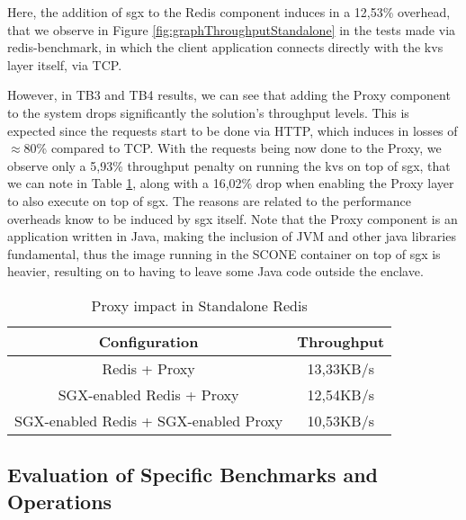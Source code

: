 Here, the addition of \gls{sgx} to the Redis component induces in a 12,53\% overhead, that we observe in Figure \ref{fig:graphThroughputStandalone} in the tests made via redis-benchmark, in which the client application connects directly with the \gls{kvs} layer itself, via TCP. 

However, in TB3 and TB4 results, we can see that adding the Proxy component to the system drops significantly the solution's throughput levels. This is expected since the requests start to be done via HTTP, which induces in losses of $\approx$80\% compared to TCP. With the requests being now done to the Proxy, we observe only a 5,93\% throughput penalty on running the \gls{kvs} on top of \gls{sgx}, that we can note in Table \ref{table:throughputSingleRedis}, along with a 16,02\% drop when enabling the Proxy layer to also execute on top of \gls{sgx}. The reasons are related to the performance overheads know to be induced by \gls{sgx} itself. Note that the Proxy component is an application written in Java, making the inclusion of JVM and other java libraries fundamental, thus the image running in the SCONE container on top of \gls{sgx} is heavier, resulting on to having to leave some Java code outside the enclave.


\begin{table}[ht]
	\caption{Proxy impact in Standalone Redis} %
	\centering %
	\begin{tabular}{c c} %
		\hline\hline %
		\textbf{Configuration} & \textbf{Throughput} \\ [0.5ex] %
		\hline
		Redis + Proxy & 13,33KB/s\\
		\hline
		SGX-enabled Redis + Proxy & 12,54KB/s \\
		\hline %
		SGX-enabled Redis + SGX-enabled Proxy & 10,53KB/s\\ [1ex] %
		\hline %
	\end{tabular}
	\label{table:throughputSingleRedis} %
\end{table}



\subsection{Evaluation of Specific Benchmarks and Operations}
\label{ssec:specificBenchmarksRedisS}

